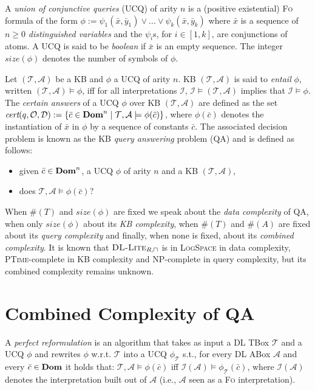 \documentclass[11pt]{llncs}
\newcommand{\e}[1]{{\bf #1}}
\newcommand{\logic}[1]{\textsc{#1}\xspace}
\newcommand{\FOL}{\logic{Fo}}
\newcommand{\g}[1]{\logic{#1}}
\newcommand{\inte}{\f{I}}
\newcommand{\tup}[1]{(#1)}
\newcommand{\card}[1]{\#(#1)}
\newcommand{\set}[1]{\{#1\}}
\newcommand{\f}[1]{\mathcal{#1}}
\newcommand{\LogSpace}{\textsc{LogSpace}\xspace}
\newcommand{\PTime}{\textsc{PTime}\xspace}
\newcommand{\NP}{\textsc{NP}\xspace}
\newcommand{\dlliterc}{\g{DL-Lite}_{R,\sqcap}\xspace}
\renewcommand{\vec}[1]{\bar{#1}} \pagestyle{empty}
\begin{document}
A {\em union of conjunctive queries} (UCQ)
of arity $n$
is a (positive existential) \FOL formula of the form
$\phi := \psi_{1}(\vec{x},\vec{y}_1) \lor ... \lor 
\psi_{k}(\vec{x},\vec{y}_k)$ 
where 
$\vec{x}$ is a sequence of $n \geq 0$
{\em distinguished variables} and
the $\psi_i$s, for $i \in [1,k]$, are conjunctions of atoms.
A UCQ is said to be {\em boolean} if $\vec{x}$
is an empty sequence. The integer $\textit{size}(\phi)$
denotes the number of symbols of $\phi$.


Let $\tup{\f{T},\f{A}}$ be a KB and $\phi$ a UCQ of arity $n$. 
KB $\tup{\f{T},\f{A}}$ is said to {\em entail}
$\phi$, written 
$\tup{\f{T},\f{A}} \models \phi$,
iff for all interpretations $\inte$, $\inte \models \tup{\f{T},\f{A}}$
implies that $\inte \models \phi$.
The {\em certain answers} of a UCQ $\phi$ over KB 
$\tup{\f{T},\f{A}}$ are defined as the set
$\textit{cert}(q,\f{O},\f{D}) := \set{\vec{c} \in \e{Dom}^n \mid 
\f{T}, \f{A} \models \phi(\vec{c})}$, where
$\phi(\vec{c})$ denotes the instantiation of $\vec{x}$ in $\phi$
by a sequence of constants $\vec{c}$. The associated decision
problem is known as the KB {\em query answering} problem (\g{QA}) 
and is
defined as follows:
\begin{itemize}
\item given $\vec{c} \in \e{Dom}^n$, a UCQ $\phi$ of arity $n$ and a
KB $\tup{\f{T}, \f{A}}$,
\item does $\f{T}, \f{A} \models \phi(\vec{c})$?
\end{itemize}

When $\card{T}$ and $\textit{size}(\phi)$ are fixed we speak about the 
{\em data complexity} of \g{QA}, when only $\textit{size}(\phi)$ about its {\em KB complexity}, 
when $\card{T}$ and $\card{A}$ are fixed about its {\em query complexity}
and finally, when none is fixed, about its {\em combined complexity}.
It is known \cite{Calvanese2007C} that $\dlliterc$ is
in \LogSpace in data complexity, \PTime-complete in KB complexity and
\NP-complete in query complexity, but its combined complexity remains unknown.

\section{Combined Complexity of \g{QA}}\label{two}


A {\em perfect reformulation} is an algorithm
that takes as input a DL TBox $\f{T}$ and a UCQ $\phi$
and rewrites $\phi$ w.r.t. $\f{T}$ into a UCQ
$\phi_{\f{T}}$ s.t., for every DL ABox
$\f{A}$ and every $\vec{c} \in \e{Dom}$ it holds that:
$\f{T} , \f{A} \models \phi(\vec{c})$ iff $\f{I}(\f{A}) \models \phi_{\f{T}}(\vec{c})$,
where $\f{I}(\f{A})$ denotes the interpretation built out of $\f{A}$
(i.e., $\f{A}$ seen as a \FOL interpretation).
\end{document}
